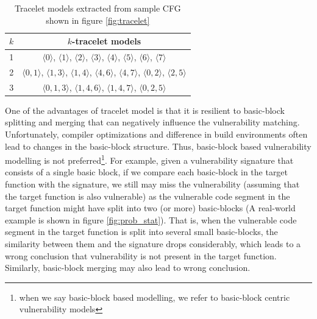 
\begin{table}[t]
\caption{Tracelet models extracted from sample CFG shown in figure \ref{fig:tracelet}}\label{tab:tracelet}
\begin{center}
{\scriptsize
\begin{tabular}{|c|c|}
  \hline 
  $k$ & $k$-tracelet models \\ 
  \hline 
  1 & $\langle 0 \rangle$, $\langle 1 \rangle$, $\langle 2 \rangle$, $\langle 3 \rangle$, $\langle4\rangle$, $\langle 5 \rangle$, $\langle 6 \rangle$, $\langle 7 \rangle$\\ 
  \hline 
  2 & $\langle 0,1 \rangle$, $\langle 1,3 \rangle$, $\langle 1,4 \rangle$, $\langle 4,6 \rangle$, $\langle 4,7 \rangle$, $\langle 0,2 \rangle$, $\langle 2,5 \rangle$\\ 
  \hline 
  3 & $\langle 0,1,3 \rangle$, $\langle 1,4,6 \rangle$, $\langle 1,4,7 \rangle$, $\langle 0,2,5 \rangle$\\ 
  \hline 
  \end{tabular}    
}
\end{center}
\end{table}


One of the advantages of tracelet model is that it is resilient to basic-block splitting and merging  that can negatively influence the vulnerability matching. Unfortunately, compiler optimizations and difference in build environments often lead to changes in the basic-block structure. Thus, basic-block based vulnerability modelling is not preferred\footnote{when we say basic-block based modelling, we refer to basic-block centric vulnerability models}.  For example, given a vulnerability signature that consists of a single basic block, if we compare each basic-block in the target function with the signature, we still may miss the vulnerability (assuming that the target function is also vulnerable) as the vulnerable code segment in the target function might have split into two (or more) basic-blocks (A real-world example is shown in figure \ref{fig:prob_stat}). That is, when the vulnerable code segment in the target function is split into several small basic-blocks, the similarity between them and the signature drops considerably, which leads to a wrong conclusion that vulnerability is not present in the target function. Similarly, basic-block merging may also lead to wrong conclusion.

